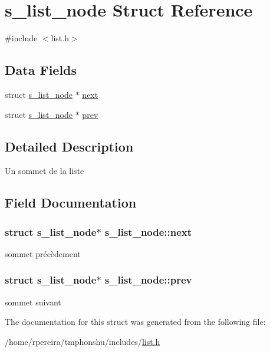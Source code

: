 \hypertarget{structs__list__node}{}\section{s\+\_\+list\+\_\+node Struct Reference}
\label{structs__list__node}


{\ttfamily \#include $<$list.\+h$>$}

\subsection*{Data Fields}
\begin{DoxyCompactItemize}
\item 
struct \hyperlink{structs__list__node}{s\+\_\+list\+\_\+node} $\ast$ \hyperlink{structs__list__node_ac7276a9f1c0e95652a447c40556a474b}{next}
\item 
struct \hyperlink{structs__list__node}{s\+\_\+list\+\_\+node} $\ast$ \hyperlink{structs__list__node_a5aab2b470c7b670ca8e6df4c87aef533}{prev}
\end{DoxyCompactItemize}


\subsection{Detailed Description}
Un sommet de la liste 

\subsection{Field Documentation}
\subsubsection[{\texorpdfstring{next}{next}}]{\setlength{\rightskip}{0pt plus 5cm}struct {\bf s\+\_\+list\+\_\+node}$\ast$ s\+\_\+list\+\_\+node\+::next}\hypertarget{structs__list__node_ac7276a9f1c0e95652a447c40556a474b}{}\label{structs__list__node_ac7276a9f1c0e95652a447c40556a474b}
sommet précèdement 
\subsubsection[{\texorpdfstring{prev}{prev}}]{\setlength{\rightskip}{0pt plus 5cm}struct {\bf s\+\_\+list\+\_\+node}$\ast$ s\+\_\+list\+\_\+node\+::prev}\hypertarget{structs__list__node_a5aab2b470c7b670ca8e6df4c87aef533}{}\label{structs__list__node_a5aab2b470c7b670ca8e6df4c87aef533}
sommet suivant 

The documentation for this struct was generated from the following file\+:\begin{DoxyCompactItemize}
\item 
/home/rpereira/tmphonshu/includes/\hyperlink{list_8h}{list.\+h}\end{DoxyCompactItemize}
